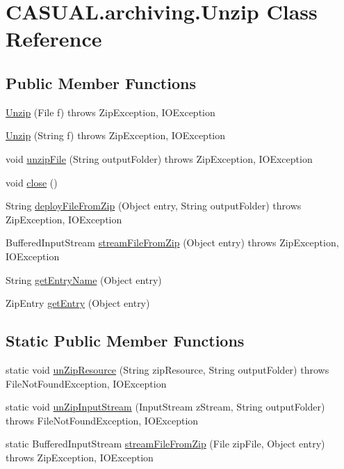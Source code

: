 \hypertarget{classCASUAL_1_1archiving_1_1Unzip}{\section{C\-A\-S\-U\-A\-L.\-archiving.\-Unzip Class Reference}
\label{classCASUAL_1_1archiving_1_1Unzip}
}
\subsection*{Public Member Functions}
\begin{DoxyCompactItemize}
\item 
\hyperlink{classCASUAL_1_1archiving_1_1Unzip_a88ff2e111af2352f8101ea87acc2d6d4}{Unzip} (File f)  throws Zip\-Exception, I\-O\-Exception 
\item 
\hyperlink{classCASUAL_1_1archiving_1_1Unzip_abc708c4bf25ed0e0edeabf0c71bbd344}{Unzip} (String f)  throws Zip\-Exception, I\-O\-Exception 
\item 
void \hyperlink{classCASUAL_1_1archiving_1_1Unzip_a477d977d8734e6064cc41cd8acc005a9}{unzip\-File} (String output\-Folder)  throws Zip\-Exception, I\-O\-Exception 
\item 
void \hyperlink{classCASUAL_1_1archiving_1_1Unzip_a14b0d899780a66d69b01ac7034d4a90e}{close} ()
\item 
String \hyperlink{classCASUAL_1_1archiving_1_1Unzip_a568a39dbfeb9064924d41b441da6e454}{deploy\-File\-From\-Zip} (Object entry, String output\-Folder)  throws Zip\-Exception, I\-O\-Exception 
\item 
Buffered\-Input\-Stream \hyperlink{classCASUAL_1_1archiving_1_1Unzip_a285658d9e0121e2859a2c35600a0c9d0}{stream\-File\-From\-Zip} (Object entry)  throws Zip\-Exception, I\-O\-Exception 
\item 
String \hyperlink{classCASUAL_1_1archiving_1_1Unzip_a750b1ed907dfd4da6931289e53094754}{get\-Entry\-Name} (Object entry)
\item 
Zip\-Entry \hyperlink{classCASUAL_1_1archiving_1_1Unzip_aebf6db26bcbca3b4f76833f8372c6302}{get\-Entry} (Object entry)
\end{DoxyCompactItemize}
\subsection*{Static Public Member Functions}
\begin{DoxyCompactItemize}
\item 
static void \hyperlink{classCASUAL_1_1archiving_1_1Unzip_a20374a024e3d57ee34f7d2f1f6e79e6f}{un\-Zip\-Resource} (String zip\-Resource, String output\-Folder)  throws File\-Not\-Found\-Exception, I\-O\-Exception 
\item 
static void \hyperlink{classCASUAL_1_1archiving_1_1Unzip_ac13b6d000c8747a6d73874cc7c95bfa8}{un\-Zip\-Input\-Stream} (Input\-Stream z\-Stream, String output\-Folder)  throws File\-Not\-Found\-Exception, I\-O\-Exception 
\item 
static Buffered\-Input\-Stream \hyperlink{classCASUAL_1_1archiving_1_1Unzip_a040693a39393fa52d90c18180f7543ea}{stream\-File\-From\-Zip} (File zip\-File, Object entry)  throws Zip\-Exception, I\-O\-Exception 
\end{DoxyCompactItemize}
